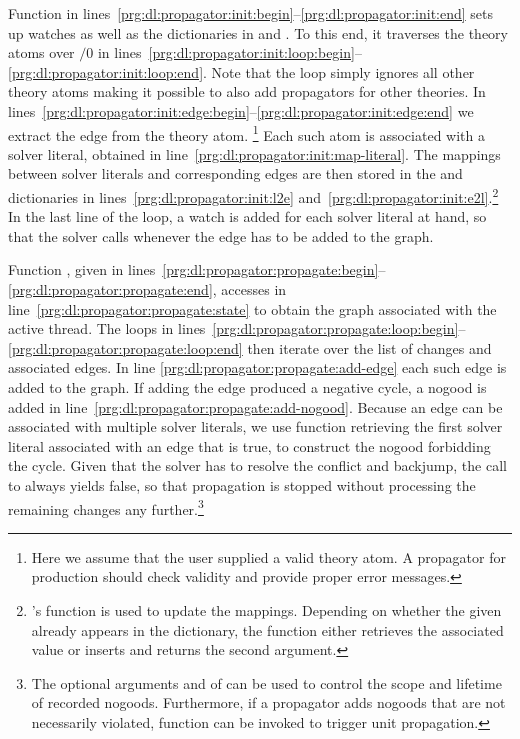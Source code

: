 Function  in lines~\ref{prg:dl:propagator:init:begin}--\ref{prg:dl:propagator:init:end}
sets up watches as well as the dictionaries in  and .
To this end,
it traverses the theory atoms over $/0$ in lines~\ref{prg:dl:propagator:init:loop:begin}--\ref{prg:dl:propagator:init:loop:end}.
Note that the loop simply ignores all other theory atoms making it possible to also add propagators for other theories.
%
In lines~\ref{prg:dl:propagator:init:edge:begin}--\ref{prg:dl:propagator:init:edge:end} we extract the edge from the theory atom.%
\footnote{Here we assume that the user supplied a valid theory atom.
  A propagator for production should check validity and provide proper error messages.}
%
Each such atom is associated with a solver literal,
obtained in line~\ref{prg:dl:propagator:init:map-literal}.
The mappings between solver literals and corresponding edges are then stored in the  and  dictionaries in
lines~\ref{prg:dl:propagator:init:l2e} and~\ref{prg:dl:propagator:init:e2l}.\footnote{
  \python's  function is used to update the mappings.
  Depending on whether the given  already appears in the dictionary,
  the function either retrieves the associated value or inserts and returns the second argument.}
In the last line of the loop, a watch is added for each solver literal at hand,
so that the solver calls  whenever the edge has to be added to the graph.

Function , given in lines~\ref{prg:dl:propagator:propagate:begin}--\ref{prg:dl:propagator:propagate:end},
accesses  in line~\ref{prg:dl:propagator:propagate:state}
to obtain the graph associated with the active thread.
%
The loops in lines~\ref{prg:dl:propagator:propagate:loop:begin}--\ref{prg:dl:propagator:propagate:loop:end} then iterate over the list of changes and associated edges.
In line \ref{prg:dl:propagator:propagate:add-edge} each such edge is added to the graph.
If adding the edge produced a negative cycle,
a nogood is added in line~\ref{prg:dl:propagator:propagate:add-nogood}.
Because an edge can be associated with multiple solver literals,
we use function 
retrieving the first solver literal associated with an edge that is true,
to construct the nogood forbidding the cycle.
%
Given that the solver has to resolve the conflict and backjump,
the call to  always yields false,
so that propagation is stopped without processing the remaining changes any further.\footnote{%
  The optional arguments  and  of  can be used to control the scope and lifetime of recorded nogoods.
  Furthermore, if a propagator adds nogoods that are not necessarily violated,
  function  can be invoked to trigger unit propagation.}

